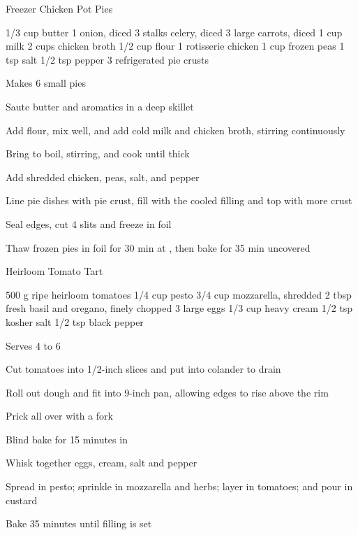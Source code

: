 
\begin{denserecipe}{Freezer Chicken Pot Pies}{}
\begin{ingredients}
1/3 cup butter
1 onion, diced
3 stalks celery, diced
3 large carrots, diced
1 cup milk
2 cups chicken broth
1/2 cup flour
1 rotisserie chicken
1 cup frozen peas
1 tsp salt
1/2 tsp pepper
3 refrigerated pie crusts
\end{ingredients}
\nextcolumn
Makes 6 small pies
\begin{steps}
    \item Saute butter and aromatics in a deep skillet
    \item Add flour, mix well, and add cold milk and chicken broth, stirring continuously
    \item Bring to boil, stirring, and cook until thick
    \item Add shredded chicken, peas, salt, and pepper
    \item Line pie dishes with pie crust, fill with the cooled filling and top with more crust
    \item Seal edges, cut 4 slits and freeze in foil
    \item Thaw frozen pies in foil for 30 min at , then bake for 35 min uncovered
\end{steps}
\end{denserecipe}

\begin{denserecipe}{Heirloom Tomato Tart}{\vegetarian{}}
\begin{ingredients}
500 g ripe heirloom tomatoes
1/4 cup pesto
3/4 cup mozzarella, \ibreak shredded
2 tbsp fresh basil and oregano, finely chopped
3 large eggs
1/3 cup heavy cream
1/2 tsp kosher salt
1/2 tsp black pepper
\end{ingredients}
\nextcolumn
Serves 4 to 6
\begin{steps}
    \item Cut tomatoes into 1/2-inch slices and put into colander to drain
    \item Roll out dough and fit into 9-inch pan, allowing edges to rise above the rim
    \item Prick all over with a fork
    \item Blind bake for 15 minutes in 
    \item Whisk together eggs, cream, salt and pepper
    \item Spread in pesto; sprinkle in mozzarella and herbs; layer in tomatoes; and pour in custard
    \item Bake 35 minutes until filling is set
\end{steps}
\end{denserecipe}

